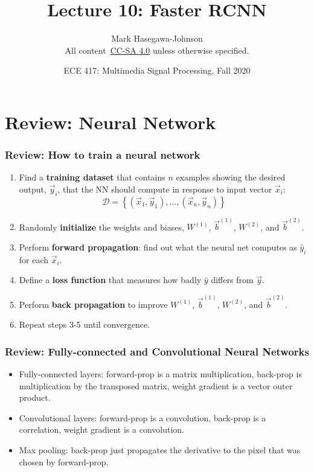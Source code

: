 \documentclass{beamer}
\title{Lecture 10: Faster RCNN}
\author{Mark Hasegawa-Johnson\\All content~\href{https://creativecommons.org/licenses/by-sa/4.0/}{CC-SA 4.0} unless otherwise specified.}
\date{ECE 417: Multimedia Signal Processing, Fall 2020}
\begin{document}
\begin{frame}
  \maketitle
\end{frame}

\begin{frame}
  \tableofcontents
\end{frame}


\section[Review]{Review: Neural Network}
\setcounter{subsection}{1}

\begin{frame}
  \frametitle{Review: How to train a neural network}
  \begin{enumerate}
  \item Find a {\bf training dataset} that contains $n$ examples showing the
    desired output, $\vec{y}_i$, that the NN should compute in
    response to input vector $\vec{x}_i$:
    \[
    {\mathcal D}=\left\{(\vec{x}_1,\vec{y}_1),\ldots,(\vec{x}_n,\vec{y}_n)\right\}
    \]
    \item Randomly {\bf initialize} the weights and biases, $W^{(1)}$,
      $\vec{b}^{(1)}$, $W^{(2)}$, and $\vec{b}^{(2)}$.
    \item Perform {\bf forward propagation}: find out what the neural
      net computes as $\hat{y}_i$ for each $\vec{x}_i$.
    \item Define a {\bf loss function} that measures
      how badly $\hat{y}$ differs from $\vec{y}$.
    \item Perform {\bf back propagation} to improve $W^{(1)}$,
      $\vec{b}^{(1)}$, $W^{(2)}$, and $\vec{b}^{(2)}$.
    \item Repeat steps 3-5 until convergence.
  \end{enumerate}
\end{frame}

\begin{frame}
  \frametitle{Review: Fully-connected and Convolutional Neural Networks}
  \begin{itemize}
  \item Fully-connected layers: forward-prop is a matrix multiplication, back-prop
    is multiplication by the transposed matrix, weight gradient is a vector outer product.
  \item Convolutional layers: forward-prop is a convolution, back-prop
    is a correlation, weight gradient is a convolution.
  \item Max pooling: back-prop just propagates the derivative to the
    pixel that was chosen by forward-prop.
  \end{itemize}
\end{frame}
\end{document}
